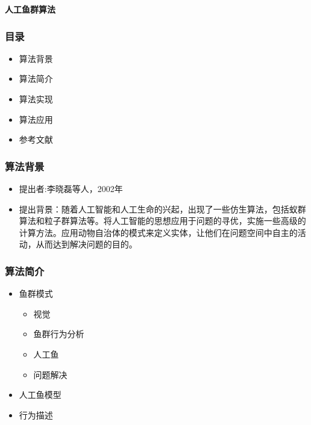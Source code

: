 
\begin{frame}
\newcommand{\song}{\setCJKfamilyfont{song}}
\newcommand{\xiaoer}{\fontsize{18pt}{18pt}\selectfont}
	\begin{center}
	{\song\xiaoer\textbf{人工鱼群算法}}
	\end{center}
\end{frame}

\begin{frame}
	\frametitle{目录}
	\begin{itemize}
		\item{算法背景}
		\item{算法简介}
		\item{算法实现}
		\item{算法应用}
		\item{参考文献}
	\end{itemize}
\end{frame}

\begin{frame}
	\frametitle{算法背景}
	\begin{itemize}
		\item{提出者:李晓磊等人，2002年}
		\item{提出背景：随着人工智能和人工生命的兴起，出现了一些仿生算法，包括蚁群算法和粒子群算法等。将人工智能的思想应用于问题的寻优，实施一些高级的计算方法。应用动物自治体的模式来定义实体，让他们在问题空间中自主的活动，从而达到解决问题的目的。}
	\end{itemize}
\end{frame}

\begin{frame}
	\frametitle{算法简介}
	\begin{itemize}
		\item{鱼群模式}
			\begin{itemize}
				\item{视觉}
				\item{鱼群行为分析}
				\item{人工鱼}
				\item{问题解决}
			\end{itemize}
		\item{人工鱼模型}
		\item{行为描述}
	\end{itemize}
\end{frame}

